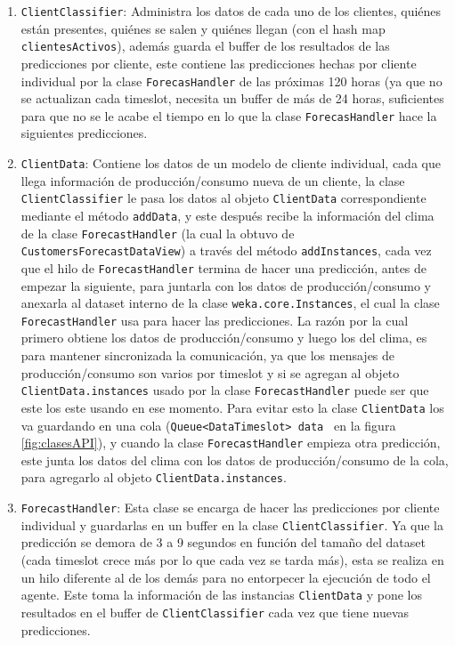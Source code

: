 \renewcommand{\labelenumi}{$\bullet$ }
\begin{enumerate}
	\item \texttt{ClientClassifier}: Administra los datos de cada uno de los clientes, quiénes están presentes, quiénes se salen y quiénes llegan (con el hash map \texttt{clientesActivos}), además guarda el buffer de los resultados de las predicciones por cliente, este contiene las predicciones hechas por cliente individual por la clase \texttt{ForecasHandler} de las próximas 120 horas (ya que no se actualizan cada timeslot, necesita un buffer de más de 24 horas, suficientes para que no se le acabe el tiempo en lo que la clase \texttt{ForecasHandler} hace la siguientes predicciones.
	
	\item \texttt{ClientData}: Contiene los datos de un modelo de cliente individual, cada que llega información de producción/consumo nueva de un cliente, la clase \texttt{ClientClassifier} le pasa los datos al objeto \texttt{ClientData} correspondiente mediante el método \texttt{addData}, y este después recibe la información del clima de la clase \texttt{ForecastHandler} (la cual la obtuvo de \texttt{CustomersForecastDataView}) a través del método \texttt{addInstances}, cada vez que el hilo de \texttt{ForecastHandler} termina de hacer una predicción, antes de empezar la siguiente, para juntarla con los datos de producción/consumo y anexarla al dataset interno de la clase \texttt{weka.core.Instances}, el cual la clase \texttt{ForecastHandler} usa para hacer las predicciones.
La razón por la cual primero obtiene los datos de producción/consumo y luego los del clima, es para mantener sincronizada la comunicación, ya que los mensajes de producción/consumo son varios por timeslot y si se agregan al objeto \texttt{ClientData.instances} usado por la clase \texttt{ForecastHandler} puede ser que este los este usando en ese momento. Para evitar esto la clase \texttt{ClientData} los va guardando en una cola ({\tt\lstinline$Queue<DataTimeslot> data$ }  en la figura \ref{fig:clasesAPI}), y cuando la clase \texttt{ForecastHandler} empieza otra predicción, este junta los datos del clima con los datos de producción/consumo de la cola, para agregarlo al objeto \texttt{ClientData.instances}.
	
	\item \texttt{ForecastHandler}: Esta clase se encarga de hacer las predicciones por cliente individual y guardarlas en un buffer en la clase \texttt{ClientClassifier}. Ya que la predicción se demora de 3 a 9 segundos en función del tamaño del dataset (cada timeslot crece más por lo que cada vez se tarda más), esta se realiza en un hilo diferente al de los demás para no entorpecer la ejecución de todo el agente. Este toma la información de las instancias \texttt{ClientData} y pone los resultados en el buffer de \texttt{ClientClassifier} cada vez que tiene nuevas predicciones.
	

\end{enumerate}
